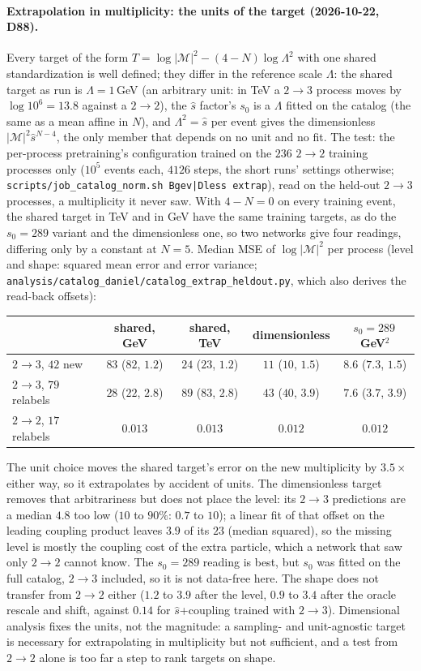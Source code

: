\documentclass[11pt]{article}
\newcommand{\code}[1]{\texttt{#1}}
\begin{document}
\paragraph{Extrapolation in multiplicity: the units of the target (2026-10-22, D88).} Every target of the form
$T=\log|\mathcal M|^2-(4-N)\log\Lambda^2$ with one shared standardization is well defined; they differ in the
reference scale $\Lambda$: the shared target as run is $\Lambda=1$\,GeV (an arbitrary unit: in TeV a $2\to3$ process moves by
$\log10^6=13.8$ against a $2\to2$), the $\hat s$ factor's $s_0$ is a $\Lambda$ fitted on the catalog (the same as a mean affine in $N$),
and $\Lambda^2=\hat s$ per event gives the dimensionless $|\mathcal M|^2\hat s^{N-4}$, the only member that depends on
no unit and no fit. The test: the per-process pretraining's configuration trained on the $236$ $2\to2$ training processes only ($10^5$ events
each, $4126$ steps, the short runs' settings otherwise; \code{scripts/job\_catalog\_norm.sh Bgev|Dless extrap}), read on
the held-out $2\to3$ processes, a multiplicity it never saw. With $4-N=0$ on every training event, the shared target in TeV and in GeV have the same training targets, as do the $s_0=289$ variant and the dimensionless one, so two networks give four readings, differing
only by a constant at $N=5$. Median MSE of $\log|\mathcal M|^2$ per process (level and shape: squared mean error and
error variance; \code{analysis/catalog\_daniel/catalog\_extrap\_heldout.py}, which also derives the read-back offsets):
\begin{center}
\begin{tabular}{lcccc}
 & shared, GeV & shared, TeV & dimensionless & $s_0=289$\,GeV$^2$ \\ \hline
$2\to3$, $42$ new & $83$ ($82$, $1.2$) & $24$ ($23$, $1.2$) & $11$ ($10$, $1.5$) & $8.6$ ($7.3$, $1.5$) \\
$2\to3$, $79$ relabels & $28$ ($22$, $2.8$) & $89$ ($83$, $2.8$) & $43$ ($40$, $3.9$) & $7.6$ ($3.7$, $3.9$) \\
$2\to2$, $17$ relabels & $0.013$ & $0.013$ & $0.012$ & $0.012$ \\
\end{tabular}
\end{center}
The unit choice moves the shared target's error on the new multiplicity by $3.5\times$ either way, so it extrapolates
by accident of units.
The dimensionless target removes that arbitrariness but does not place the level: its $2\to3$ predictions are a median
$4.8$ too low ($10$ to $90\%$: $0.7$ to $10$); a linear fit of that offset on the leading coupling product leaves $3.9$ of
its $23$ (median squared), so the missing level is mostly the coupling cost of the extra particle, which a network that
saw only $2\to2$ cannot know. The $s_0=289$ reading is best, but $s_0$ was fitted on the full catalog, $2\to3$ included,
so it is not data-free here. The shape does not transfer from $2\to2$ either ($1.2$ to $3.9$ after the level, $0.9$ to
$3.4$ after the oracle rescale and shift, against $0.14$ for $\hat s$+coupling trained with $2\to3$). Dimensional analysis fixes the units,
not the magnitude: a sampling- and unit-agnostic target is necessary for extrapolating in multiplicity but not sufficient,
and a test from $2\to2$ alone is too far a step to rank targets on shape.
\end{document}

